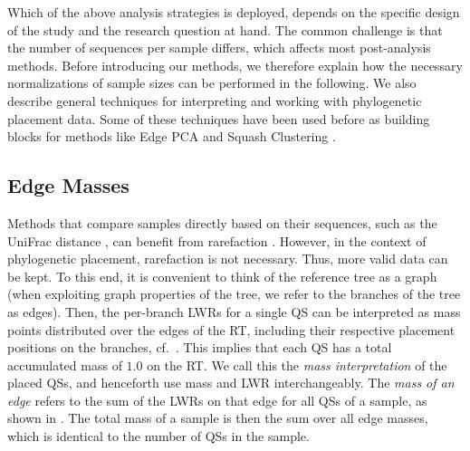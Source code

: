 Which of the above analysis strategies is deployed,
depends on the specific design of the study and the research question at hand.
The common challenge is that the number of sequences per sample differs, which affects most post-analysis methods.
Before introducing our methods,
we therefore explain how the necessary normalizations of sample sizes can be performed in the following.
We also describe general techniques for interpreting and working with phylogenetic placement data.
Some of these techniques have been used before as building blocks
for methods like Edge PCA and Squash Clustering \cite{Matsen2011a,Evans2012}. 


\subsection{Edge Masses}
\label{ch:Foundations:sec:PhylogeneticPlacementProcessing:sub:EdgeMasses}

Methods that compare samples directly based on their sequences,
such as the UniFrac distance \cite{Lozupone2005,Lozupone2007a},
can benefit from rarefaction \cite{Weiss2017}.
However, in the context of phylogenetic placement, rarefaction is not necessary.
Thus, more valid data can be kept.
To this end, it is convenient to think of the reference tree as a graph
(when exploiting graph properties of the tree, we refer to the branches of the tree as edges).
Then, the per-branch \acp{LWR} for a single \ac{QS}
can be interpreted as mass points distributed over the edges of the \ac{RT},
including their respective placement positions on the branches,
cf.~.
This implies that each \ac{QS} has a total accumulated mass of $1.0$ on the \ac{RT}.
We call this the \emph{mass interpretation} of the placed \acp{QS}, and henceforth use mass and \ac{LWR} interchangeably.
The \emph{mass of an edge} refers to the sum of the \acp{LWR} on that edge for all \acp{QS} of a sample,
as shown in .
The total mass of a sample is then the sum over all edge masses,
which is identical to the number of \acp{QS} in the sample.

